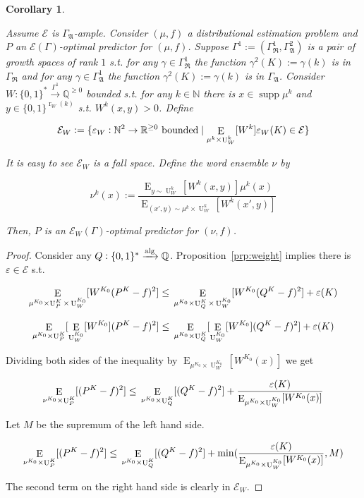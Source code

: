 \documentclass{article}
\numberwithin{equation}{section}
\theoremstyle{definition}
\theoremstyle{plain}
\newtheorem{corollary}{Corollary}[section]
\newcommand{\Bool}{\{0,1\}}
\newcommand{\Words}{{\Bool^*}}
\newcommand{\WordsLen}[1]{{\Bool^{#1}}}
\DeclareMathOperator{\Supp}{supp}
\DeclareMathOperator{\E}{E}
\DeclareMathOperator{\R}{r}
\DeclareMathOperator{\Un}{U}
\newcommand{\Nats}{\mathbb{N}}
\newcommand{\Rats}{\mathbb{Q}}
\newcommand{\Reals}{\mathbb{R}}
\newcommand{\GrowR}{\Gamma_{\mathfrak{R}}}
\newcommand{\GrowA}{\Gamma_{\mathfrak{A}}}
\newcommand{\Fall}{\mathcal{E}}
\newcommand{\EG}{\Fall(\Gamma)}
\newcommand{\Alg}{\xrightarrow{\textnormal{alg}}}
\begin{document}
\begin{samepage}
\begin{corollary}
\label{crl:weight}

Assume $\Fall$ is $\GrowA$-ample. Consider $(\mu,f)$ a distributional estimation problem and $P$ an $\EG$-optimal predictor for $(\mu,f)$. Suppose ${\Gamma^1:=(\GrowR^1,\GrowA^2)}$ is a pair of growth spaces of rank $1$ s.t. for any $\gamma \in \GrowR^1$ the function ${\gamma^2(K):=\gamma(k)}$ is in $\GrowR$ and for any $\gamma \in \GrowA^1$ the function $\gamma^2(K):=\gamma(k)$ is in $\GrowA$. Consider ${W: \Words \xrightarrow{\Gamma^1} \Rats^{\geq 0}}$ bounded s.t. for any $k \in \Nats$ there is $x \in \Supp \mu^k$ and $y \in \WordsLen{\R_W(k)}$ s.t. $W^k(x,y) > 0$. Define 

$${\Fall_W:=\{\varepsilon_W: \Nats^2 \rightarrow \Reals^{\geq 0} \textnormal{ bounded} \mid  \E_{\mu^k \times \Un_W^k}[W^k]\varepsilon_W(K) \in \Fall\}}$$

It is easy to see $\Fall_W$ is a fall space. Define the word ensemble $\nu$ by 

\[\nu^k(x):=\frac{\E_{y \sim \Un_W^k}[W^k(x,y)] \mu^k(x)}{\E_{(x',y) \sim \mu^k \times \Un_W^k}[W^k(x',y)]}\]

Then, $P$ is an $\Fall_W(\Gamma)$-optimal predictor for $(\nu,f)$.

\end{corollary}
\end{samepage}

\begin{proof}

Consider any $Q: \Words \Alg \Rats$. Proposition~\ref{prp:weight} implies there is $\varepsilon \in \Fall$ s.t.

$$\E_{\mu^{K_0} \times \Un_P^{K} \times \Un_W^{K_0}}[W^{K_0}(P^{K} - f)^2] \leq \\ \E_{\mu^{K_0} \times \Un_Q^{K} \times \Un_W^{K_0}}[W^{K_0}(Q^{K} - f)^2] + \varepsilon(K)$$

$$\E_{\mu^{K_0} \times \Un_P^{K}}[\E_{\Un_W^{K_0}}[W^{K_0}](P^{K} - f)^2] \leq \\ \E_{\mu^{K_0} \times \Un_Q^{K}}[\E_{\Un_W^{K_0}}[W^{K_0}](Q^{K} - f)^2] + \varepsilon(K)$$

Dividing both sides of the inequality by $\E_{\mu^{K_0} \times \Un_W^{K_0}}[W^{K_0}(x)]$ we get

$$\E_{\nu^{K_0} \times \Un_P^{K}}[(P^{K} - f)^2] \leq \\ \E_{\nu^{K_0} \times \Un_Q^{K}}[(Q^{K} - f)^2] + \frac{\varepsilon(K)}{\E_{\mu^{K_0} \times \Un_W^{K_0}}[W^{K_0}(x)]}$$

Let $M$ be the supremum of the left hand side.

$$\E_{\nu^{K_0} \times \Un_P^{K}}[(P^{K} - f)^2] \leq \\ \E_{\nu^{K_0} \times \Un_Q^{K}}[(Q^{K} - f)^2] + \min(\frac{\varepsilon(K)}{\E_{\mu^{K_0} \times \Un_W^{K_0}}[W^{K_0}(x)]},M)$$

The second term on the right hand side is clearly in $\Fall_W$.
\end{proof}
\end{document}
